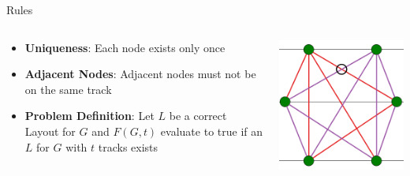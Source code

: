 \documentclass[hyperref={pdfpagelabels=false},aspectratio=169]{beamer}
\theoremstyle{definition}
\begin{document}
\begin{frame}{Rules}
\begin{columns}
    \begin{column}{0.5\textwidth}
        \begin{itemize}
            \item \textbf{Uniqueness}: Each node exists only once
            \item \textbf{Adjacent Nodes}: Adjacent nodes must not be on the same track
            \item \textbf{Problem Definition}: Let $L$ be a correct Layout for $G$ and $F(G, t)$ evaluate to true if an $L$ for $G$ with $t$ tracks exists
        \end{itemize}
    \end{column}
    \begin{column}{0.5\textwidth}
        \vspace{2cm}
        \includegraphics[scale=0.6]{img/Regeln_1.png}
    \end{column}
\end{columns}
\end{frame}
\end{document}
